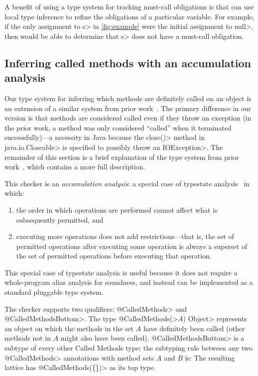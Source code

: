 A benefit of using a type system for tracking must-call obligations is
that \Tool can use local type inference to refine the obligations of
a particular variable. For example, if the only assignment to \<s>
in \cref{fig:example} were the initial assignment to \<null>, then
\Tool would be able to determine that \<s> does not have a must-call
obligation.

\subsection{Inferring called methods with an accumulation analysis}
\label{sec:called-methods}

Our type system for inferring which methods are definitely called on an object
is an extension of a similar system
from prior work~\cite{KelloggRSSE2020}.  The primary difference in our
version is that methods are considered called even if they throw an exception
(in the prior work, a method was only considered ``called'' when it terminated
successfully)---a necessity in Java because the \<close()> method
in \<java.io.Closeable> is specified to possibly throw an \<IOException>.
The remainder of this section is a brief explanation
of the type system from prior work~\cite{KelloggRSSE2020}, which contains
a more full description.

This checker is an \emph{accumulation analysis}: a special case
of typestate analysis~\cite{StromY86} in which:
\begin{enumerate}
\item the order in which operations are performed cannot affect what is
  subsequently permitted, and
\item executing more operations does not add restrictions---that is,
  the set of permitted operations after executing some operation is always
  a superset of the set of permitted operations before executing that operation.
\end{enumerate}
This special case of typestate analysis is useful because it does not
require a whole-program alias analysis for soundness, and instead
can be implemented as a standard pluggable type system.

The checker supports two qualifiers: \<@CalledMethods>
and \<@CalledMethodsBottom>. The type \<@CalledMethods(>$A$\<) Object>
represents an object on which the methods in the set $A$ have definitely
been called (other methods not in $A$ might also have been called).
\<@CalledMethodsBottom> is a subtype of every other Called Methods type; the subtyping
rule between any two \<@CalledMethods> annotations with method sets $A$
and $B$ is:
The resulting lattice has \<@CalledMethods(\{\})> as its top type.

